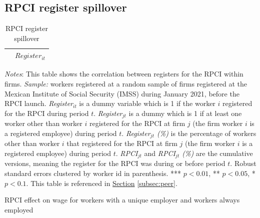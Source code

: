 \documentclass[oneside,11pt]{article}
\begin{document}
\clearpage

\subsection{RPCI register spillover}

\begin{table}[H]
\footnotesize
\centering
\begin{threeparttable}
\centering
\caption{RPCI register spillover\label{tab:peer_rpci}}

\begin{tabular}[t]{lcccc}
\toprule
\toprule
& \multicolumn{4}{c}{$Register_{it}$} \\
\midrule


\bottomrule
\bottomrule

\end{tabular}

\begin{tablenotes}
\setlength{}
\scriptsize
\item \textit{Notes}: This table shows the correlation between registers for the RPCI within firms. \textit{Sample:} workers registered at a random sample of firms registered at the Mexican Institute of Social Security (IMSS) during January 2021, before the RPCI launch. \textit{Register$_{it}$} is a dummy variable which is 1 if the worker $i$ registered for the RPCI during period $t$. \textit{Register$_{jt}$} is a dummy which is 1 if at least one worker other than worker $i$ registered for the RPCI at firm $j$ (the firm worker $i$ is a registered employee) during period $t$. \textit{Register$_{jt}$ (\%)} is the percentage of workers other than worker $i$ that registered for the RPCI at firm $j$ (the firm worker $i$ is a registered employee) during period $t$. \textit{RPCI$_{jt}$} and \textit{RPCI$_{jt}$ (\%)} are the cumulative versions, meaning the register for the RPCI was during or before period $t$. Robust standard errors clustered by worker id in parenthesis. *** $p<0.01$, ** $p<0.05$, * $p<0.1$. This table is referenced in \hyperref[subsec:peer]{Section} \ref{subsec:peer}.
\end{tablenotes}
\end{threeparttable}
\end{table}

\clearpage

\begin{table}[H]
    \caption{RPCI effect on wage for workers with a unique employer and workers always employed}
    \label{twfe_wage_same_idrfc}
    \begin{center}
    \scriptsize{}
    \end{center}
\end{table}
\end{document}
